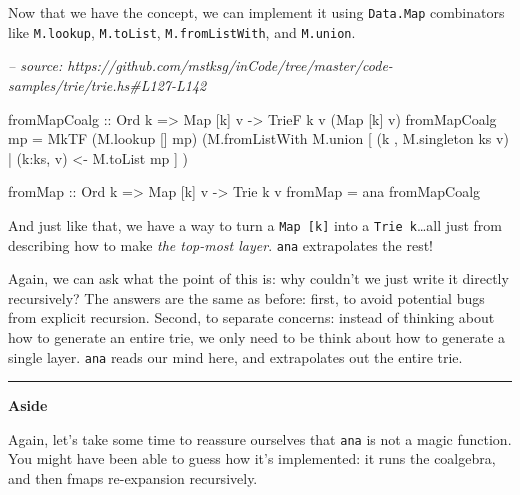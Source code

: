\documentclass[]{article}
\newenvironment{Shaded}{}{}
\newcommand{\CommentTok}[1]{\textcolor[rgb]{0.38,0.63,0.69}{\textit{#1}}}
\newcommand{\DataTypeTok}[1]{\textcolor[rgb]{0.56,0.13,0.00}{#1}}
\newcommand{\FunctionTok}[1]{\textcolor[rgb]{0.02,0.16,0.49}{#1}}
\newcommand{\NormalTok}[1]{#1}
\newcommand{\OtherTok}[1]{\textcolor[rgb]{0.00,0.44,0.13}{#1}}
\begin{document}
Now that we have the concept, we can implement it using \texttt{Data.Map}
combinators like \texttt{M.lookup}, \texttt{M.toList}, \texttt{M.fromListWith},
and \texttt{M.union}.

\begin{Shaded}
\begin{Highlighting}[]
\CommentTok{-- source: https://github.com/mstksg/inCode/tree/master/code-samples/trie/trie.hs#L127-L142}

\NormalTok{fromMapCoalg}
\OtherTok{    ::} \DataTypeTok{Ord}\NormalTok{ k}
    \OtherTok{=>} \DataTypeTok{Map}\NormalTok{ [k] v}
    \OtherTok{->} \DataTypeTok{TrieF}\NormalTok{ k v (}\DataTypeTok{Map}\NormalTok{ [k] v)}
\NormalTok{fromMapCoalg mp }\FunctionTok{=} \DataTypeTok{MkTF}\NormalTok{ (M.lookup [] mp)}
\NormalTok{                       (M.fromListWith M.union}
\NormalTok{                          [ (k   , M.singleton ks v)}
                          \FunctionTok{|}\NormalTok{ (k}\FunctionTok{:}\NormalTok{ks, v) }\OtherTok{<-}\NormalTok{ M.toList mp}
\NormalTok{                          ]}
\NormalTok{                       )}

\NormalTok{fromMap}
\OtherTok{    ::} \DataTypeTok{Ord}\NormalTok{ k}
    \OtherTok{=>} \DataTypeTok{Map}\NormalTok{ [k] v}
    \OtherTok{->} \DataTypeTok{Trie}\NormalTok{ k v}
\NormalTok{fromMap }\FunctionTok{=}\NormalTok{ ana fromMapCoalg}
\end{Highlighting}
\end{Shaded}

And just like that, we have a way to turn a \texttt{Map\ {[}k{]}} into a
\texttt{Trie\ k}\ldots{}all just from describing how to make \emph{the top-most
layer}. \texttt{ana} extrapolates the rest!

Again, we can ask what the point of this is: why couldn't we just write it
directly recursively? The answers are the same as before: first, to avoid
potential bugs from explicit recursion. Second, to separate concerns: instead of
thinking about how to generate an entire trie, we only need to be think about
how to generate a single layer. \texttt{ana} reads our mind here, and
extrapolates out the entire trie.

\begin{center}\rule{0.5\linewidth}{\linethickness}\end{center}

\textbf{Aside}

Again, let's take some time to reassure ourselves that \texttt{ana} is not a
magic function. You might have been able to guess how it's implemented: it runs
the coalgebra, and then fmaps re-expansion recursively.
\end{document}
